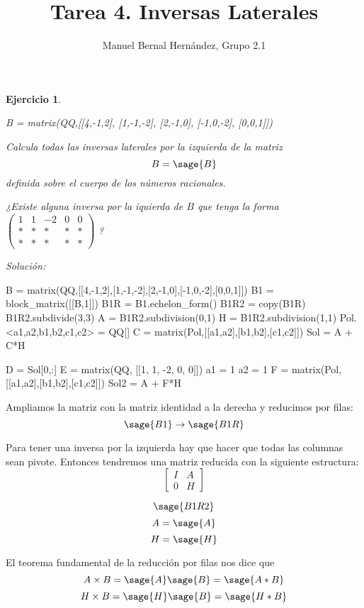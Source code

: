 \documentclass{amsart}
\title{Tarea 4. Inversas Laterales}
\author{Manuel Bernal Hernández, Grupo 2.1}
\newtheorem{ejer}{Ejercicio}
\begin{document}
\maketitle

\begin{ejer}
\begin{sagecode}
B = matrix(QQ,[[4,-1,2],
[1,-1,-2],
[2,-1,0],
[-1,0,-2],
[0,0,1]])
\end{sagecode}

Calcula todas las inversas laterales por la izquierda de la matriz 
$$ B = \sage{B} $$
definida sobre el cuerpo de los números racionales. 

¿Existe alguna inversa por la iquierda de $B$ que tenga la forma
$\left(\begin{array}{rrrrr}
1 & 1 & -2 & 0 & 0 \\
* & * & * & * & * \\
* & * & * & * & *
\end{array}\right)$
?
\end{ejer}

{\it Solución: }

\begin{sageblock}
B = matrix(QQ,[[4,-1,2],[1,-1,-2],[2,-1,0],[-1,0,-2],[0,0,1]])
B1 = block_matrix([[B,1]])
B1R = B1.echelon_form()
B1R2 = copy(B1R)
B1R2.subdivide(3,3)
A = B1R2.subdivision(0,1)
H = B1R2.subdivision(1,1)
Pol.<a1,a2,b1,b2,c1,c2> = QQ[]
C = matrix(Pol,[[a1,a2],[b1,b2],[c1,c2]])
Sol = A + C*H

D = Sol[0,:]
E = matrix(QQ, [[1, 1, -2, 0, 0]])
a1 = 1
a2 = 1
F = matrix(Pol,[[a1,a2],[b1,b2],[c1,c2]])
Sol2 = A + F*H
\end{sageblock}

Ampliamos la matriz con la matriz identidad a la derecha y reducimos por filas:
$$ \sage{B1} \to \sage{B1R} $$

Para tener una inversa por la izquierda hay que hacer que todas las columnas sean pivote.
Entonces tendremos una matriz reducida con la siguiente estructura:
$$ \left[\begin{array}{c|c} I & A \\ \hline 0 & H \end{array}\right]$$

$$ \sage{B1R2} $$
$$ A = \sage{A} $$
$$ H = \sage{H} $$

El teorema fundamental de la reducción por filas nos dice que 
$$ A \times B = \sage{A} \sage{B} = \sage{A*B} $$
$$ H \times B = \sage{H} \sage{B} = \sage{H*B} $$
\end{document}
